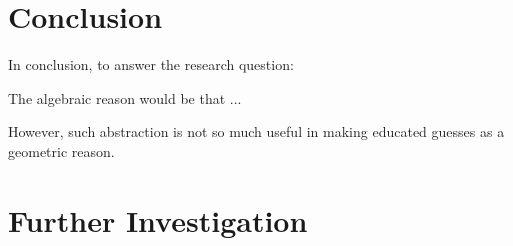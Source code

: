 \section{Conclusion}
In conclusion, to answer the research question:
\researchquestion{}

The algebraic reason would be that ...

However, such abstraction is not so much useful in making educated guesses as a geometric reason. 
\section{Further Investigation} 